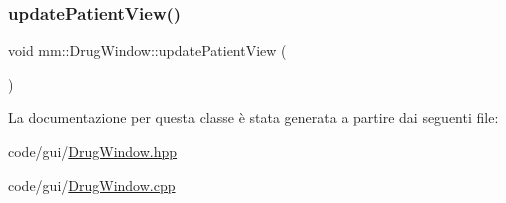 \mbox{\label{classmm_1_1_drug_window_a069d6731dcbf47f32e6be18a8ecb0472}} 
\subsubsection{\texorpdfstring{update\+Patient\+View()}{updatePatientView()}}
{\footnotesize\ttfamily void mm\+::\+Drug\+Window\+::update\+Patient\+View (\begin{DoxyParamCaption}{ }\end{DoxyParamCaption})}



La documentazione per questa classe è stata generata a partire dai seguenti file\+:\begin{DoxyCompactItemize}
\item 
code/gui/\mbox{\hyperlink{_drug_window_8hpp}{Drug\+Window.\+hpp}}\item 
code/gui/\mbox{\hyperlink{_drug_window_8cpp}{Drug\+Window.\+cpp}}\end{DoxyCompactItemize}
